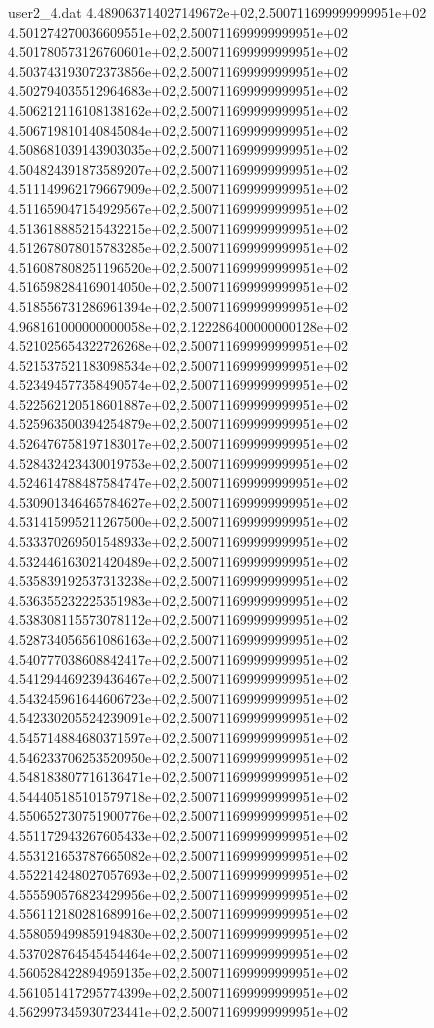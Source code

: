 \begin{filecontents}{user2_4.dat}
4.489063714027149672e+02,2.500711699999999951e+02
4.501274270036609551e+02,2.500711699999999951e+02
4.501780573126760601e+02,2.500711699999999951e+02
4.503743193072373856e+02,2.500711699999999951e+02
4.502794035512964683e+02,2.500711699999999951e+02
4.506212116108138162e+02,2.500711699999999951e+02
4.506719810140845084e+02,2.500711699999999951e+02
4.508681039143903035e+02,2.500711699999999951e+02
4.504824391873589207e+02,2.500711699999999951e+02
4.511149962179667909e+02,2.500711699999999951e+02
4.511659047154929567e+02,2.500711699999999951e+02
4.513618885215432215e+02,2.500711699999999951e+02
4.512678078015783285e+02,2.500711699999999951e+02
4.516087808251196520e+02,2.500711699999999951e+02
4.516598284169014050e+02,2.500711699999999951e+02
4.518556731286961394e+02,2.500711699999999951e+02
4.968161000000000058e+02,2.122286400000000128e+02
4.521025654322726268e+02,2.500711699999999951e+02
4.521537521183098534e+02,2.500711699999999951e+02
4.523494577358490574e+02,2.500711699999999951e+02
4.522562120518601887e+02,2.500711699999999951e+02
4.525963500394254879e+02,2.500711699999999951e+02
4.526476758197183017e+02,2.500711699999999951e+02
4.528432423430019753e+02,2.500711699999999951e+02
4.524614788487584747e+02,2.500711699999999951e+02
4.530901346465784627e+02,2.500711699999999951e+02
4.531415995211267500e+02,2.500711699999999951e+02
4.533370269501548933e+02,2.500711699999999951e+02
4.532446163021420489e+02,2.500711699999999951e+02
4.535839192537313238e+02,2.500711699999999951e+02
4.536355232225351983e+02,2.500711699999999951e+02
4.538308115573078112e+02,2.500711699999999951e+02
4.528734056561086163e+02,2.500711699999999951e+02
4.540777038608842417e+02,2.500711699999999951e+02
4.541294469239436467e+02,2.500711699999999951e+02
4.543245961644606723e+02,2.500711699999999951e+02
4.542330205524239091e+02,2.500711699999999951e+02
4.545714884680371597e+02,2.500711699999999951e+02
4.546233706253520950e+02,2.500711699999999951e+02
4.548183807716136471e+02,2.500711699999999951e+02
4.544405185101579718e+02,2.500711699999999951e+02
4.550652730751900776e+02,2.500711699999999951e+02
4.551172943267605433e+02,2.500711699999999951e+02
4.553121653787665082e+02,2.500711699999999951e+02
4.552214248027057693e+02,2.500711699999999951e+02
4.555590576823429956e+02,2.500711699999999951e+02
4.556112180281689916e+02,2.500711699999999951e+02
4.558059499859194830e+02,2.500711699999999951e+02
4.537028764545454464e+02,2.500711699999999951e+02
4.560528422894959135e+02,2.500711699999999951e+02
4.561051417295774399e+02,2.500711699999999951e+02
4.562997345930723441e+02,2.500711699999999951e+02

\end{filecontents}
